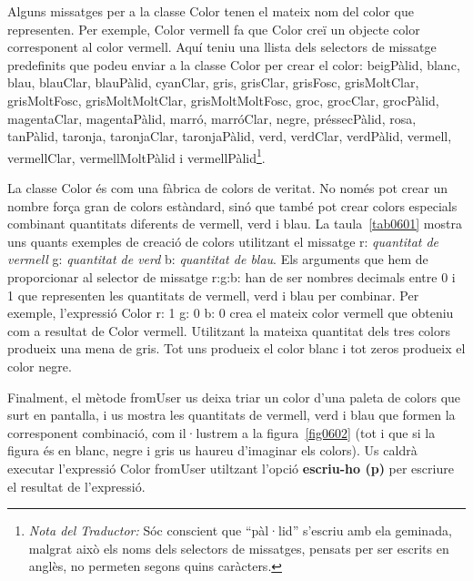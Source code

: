 Alguns missatges per a la classe \textsf{Color} tenen el mateix nom del color que representen. Per exemple, \textsf{Color vermell} fa que \textsf{Color} creï un objecte color corresponent al color vermell. Aquí teniu una llista dels selectors de missatge predefinits que podeu enviar a la classe \textsf{Color} per crear el color:
\textsf{beigPàlid}, \textsf{blanc}, \textsf{blau}, \textsf{blauClar}, \textsf{blauPàlid}, \textsf{cyanClar}, \textsf{gris}, \textsf{grisClar}, \textsf{grisFosc}, \textsf{grisMoltClar}, \textsf{grisMoltFosc}, \textsf{grisMoltMoltClar}, \textsf{grisMoltMoltFosc}, \textsf{groc}, \textsf{grocClar}, \textsf{grocPàlid}, \textsf{magentaClar}, \textsf{magentaPàlid}, \textsf{marró}, \textsf{marróClar}, \textsf{negre}, \textsf{préssecPàlid}, \textsf{rosa}, \textsf{tanPàlid}, \textsf{taronja}, \textsf{taronjaClar}, \textsf{taronjaPàlid}, \textsf{verd}, \textsf{verdClar}, \textsf{verdPàlid}, \textsf{vermell}, \textsf{vermellClar}, \textsf{vermellMoltPàlid} i \textsf{vermellPàlid}\footnote{\emph{Nota del Traductor:} Sóc conscient que ``pàl·lid'' s'escriu amb ela geminada, malgrat això els noms dels selectors de missatges, pensats per ser escrits en anglès, no permeten segons quins caràcters.}. 

La classe \textsf{Color} és com una fàbrica de colors de veritat. No només pot crear un nombre força gran de colors estàndard, sinó que també pot crear colors especials combinant quantitats diferents de vermell, verd i blau. La taula~\ref{tab0601} mostra uns quants exemples de creació de colors utilitzant el missatge \textsf{r: {\itshape quantitat de vermell} g: {\itshape quantitat de verd} b: {\itshape quantitat de blau}}. Els arguments que hem de proporcionar al selector de missatge \textsf{r:g:b:} han de ser nombres decimals entre 0 i 1 que representen les quantitats de vermell, verd i blau per combinar. Per exemple, l'expressió \textsf{Color r: 1 g: 0 b: 0} crea el mateix color vermell que obteniu com a resultat de \textsf{Color vermell}. Utilitzant la mateixa quantitat dels tres colors produeix una mena de gris. Tot uns produeix el color blanc i tot zeros produeix el color negre.     

Finalment, el mètode \textsf{fromUser} us deixa triar un color d'una paleta de colors que surt en pantalla, i us mostra les quantitats de vermell, verd i blau que formen la corresponent combinació, com il·lustrem a la figura~\ref{fig0602} (tot i que si la figura és en blanc, negre i gris us haureu d'imaginar els colors). Us caldrà executar l'expressió \textsf{Color fromUser} utiltzant l'opció \textbf{escriu-ho (p)} per escriure el resultat de l'expressió. 

